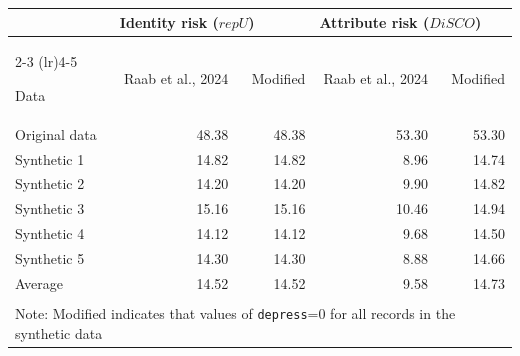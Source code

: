 \begin{tabular}{lrrrr}
   
\toprule & 
\multicolumn{2}{l}{Identity risk ($repU$)} &
\multicolumn{2}{l}{Attribute risk ($DiSCO$)}
\\  
 
\cmidrule(lr){2-3}
\cmidrule(lr){4-5}
 
Data & Raab et al., 2024 & Modified & Raab et al., 2024 & Modified
\\ 

\midrule
Original data & 48.38 & 48.38 & 53.30 & 53.30 \\ 
   \midrule
Synthetic 1 & 14.82 & 14.82 & 8.96 & 14.74 \\ 
  Synthetic 2 & 14.20 & 14.20 & 9.90 & 14.82 \\ 
  Synthetic 3 & 15.16 & 15.16 & 10.46 & 14.94 \\ 
  Synthetic 4 & 14.12 & 14.12 & 9.68 & 14.50 \\ 
  Synthetic 5 & 14.30 & 14.30 & 8.88 & 14.66 \\ 
   \midrule
Average & 14.52 & 14.52 & 9.58 & 14.73 \\ 
   \bottomrule \\[-1.8ex] \multicolumn{5}{p{5in}}{Note: Modified indicates that values of \texttt{depress}=0 for all records in the synthetic data} 
\end{tabular}
